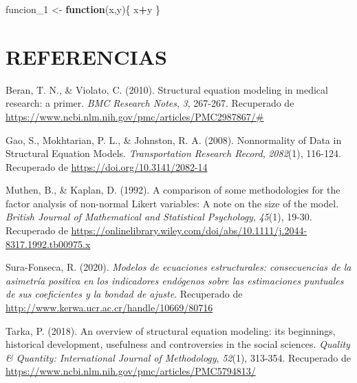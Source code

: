 \documentclass[
]{article}
\newenvironment{Shaded}{\begin{snugshade}}{\end{snugshade}}
\newcommand{\ControlFlowTok}[1]{\textcolor[rgb]{0.13,0.29,0.53}{\textbf{#1}}}
\newcommand{\DecValTok}[1]{\textcolor[rgb]{0.00,0.00,0.81}{#1}}
\newcommand{\NormalTok}[1]{#1}
\newcommand{\OperatorTok}[1]{\textcolor[rgb]{0.81,0.36,0.00}{\textbf{#1}}}
\newcommand{\StringTok}[1]{\textcolor[rgb]{0.31,0.60,0.02}{#1}}
\begin{document}
\label{funcion1}

\begin{Shaded}
\begin{Highlighting}[]
\NormalTok{funcion_}\DecValTok{1}\NormalTok{ <-}\StringTok{ }\ControlFlowTok{function}\NormalTok{(x,y)\{}
\NormalTok{    x}\OperatorTok{+}\NormalTok{y}
\NormalTok{\}}
\end{Highlighting}
\end{Shaded}

\section{REFERENCIAS}

\hypertarget{refs}{}
\leavevmode\hypertarget{ref-Beran2010StructuralEM}{}%
Beran, T. N., \& Violato, C. (2010). Structural equation modeling in
medical research: a primer. \emph{BMC Research Notes}, \emph{3},
267-267. Recuperado de
\url{https://www.ncbi.nlm.nih.gov/pmc/articles/PMC2987867/\#}

\leavevmode\hypertarget{ref-gao}{}%
Gao, S., Mokhtarian, P. L., \& Johnston, R. A. (2008). Nonnormality of
Data in Structural Equation Models. \emph{Transportation Research
Record}, \emph{2082}(1), 116-124. Recuperado de
\href{\%20https://doi.org/10.3141/2082-14}{https://doi.org/10.3141/2082-14}

\leavevmode\hypertarget{ref-muthen}{}%
Muthen, B., \& Kaplan, D. (1992). A comparison of some methodologies for
the factor analysis of non-normal Likert variables: A note on the size
of the model. \emph{British Journal of Mathematical and Statistical
Psychology}, \emph{45}(1), 19-30. Recuperado de
\url{https://onlinelibrary.wiley.com/doi/abs/10.1111/j.2044-8317.1992.tb00975.x}

\leavevmode\hypertarget{ref-sura}{}%
Sura-Fonseca, R. (2020). \emph{Modelos de ecuaciones estructurales:
consecuencias de la asimetría positiva en los indicadores endógenos
sobre las estimaciones puntuales de sus coeficientes y la bondad de
ajuste}. Recuperado de
\url{http://www.kerwa.ucr.ac.cr/handle/10669/80716}

\leavevmode\hypertarget{ref-Tarka}{}%
Tarka, P. (2018). An overview of structural equation modeling: its
beginnings, historical development, usefulness and controversies in the
social sciences. \emph{Quality \& Quantity: International Journal of
Methodology}, \emph{52}(1), 313-354. Recuperado de
\url{https://www.ncbi.nlm.nih.gov/pmc/articles/PMC5794813/}
\end{document}

